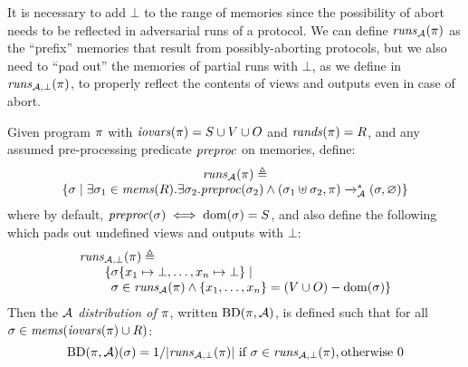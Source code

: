 It is necessary to add $\bot$ to the range of memories since
the possibility of abort needs to be reflected in adversarial
runs of a protocol. We can define $\mathit{runs}_{\mathcal{A}}(\pi)$
as the ``prefix'' memories that result from possibly-aborting
protocols, but we also need to ``pad out'' the memories
of partial runs with $\bot$, as we define in $\mathit{runs}_{\mathcal{A},\bot}(\pi)$,
to properly reflect the contents of views and outputs even in case of abort. 
\begin{definition}
  \label{def-aprogd}
  \label{def-aprogtt}
  \label{definition-aprogd}
  Given program $\pi$ with $\mathit{iovars}(\pi) = S \cup V \cup O$ and $\mathit{rands}(\pi) = R$, and
  any assumed pre-processing predicate $\mathit{preproc}$ on memories, define:
  $$
  \begin{array}{c}
    \mathit{runs}_{\mathcal{A}}(\pi) \triangleq \\
    \{ \sigma \mid \exists \sigma_1 \in \mathit{mems}(R) . 
    \exists \sigma_2 . \mathit{preproc}(\sigma_2) \wedge
    (\sigma_1 \uplus \sigma_2,\pi) \xrightarrow{}^{*}_{\mathcal{A}} (\sigma,\varnothing) \}
  \end{array}
  $$
  where by default, $\mathit{preproc}(\sigma) \iff \mathrm{dom}(\sigma) = S$, and also define the following
  which pads out undefined views and outputs with $\bot$:
  $$
  \begin{array}{l}
    \botruns(\prog) \defeq \\
    \qquad \{ \store\{ x_1 \mapsto \bot, \ldots, x_n \mapsto \bot \} \mid \\
    \qquad \phantom{\{} \store \in \aruns(\prog) \wedge \{ x_1,\ldots,x_n\} = (V \cup O) - \dom(\store) \}
  \end{array}
  $$
  Then the \emph{$\mathcal{A}$ distribution of $\pi$}, written $\mathrm{BD}(\pi,\mathcal{A})$, is
  defined such that for all $\sigma \in \mathit{mems}(\mathit{iovars}(\pi) \cup R)$:
  $$
  \mathrm{BD}(\pi,\mathcal{A})(\sigma) =  1 / |\mathit{runs}_{\mathcal{A},\bot}(\pi)| \ \text{if}\ \sigma \in \mathit{runs}_{\mathcal{A},\bot}(\pi), \text{otherwise}\ 0
  $$
\end{definition}


